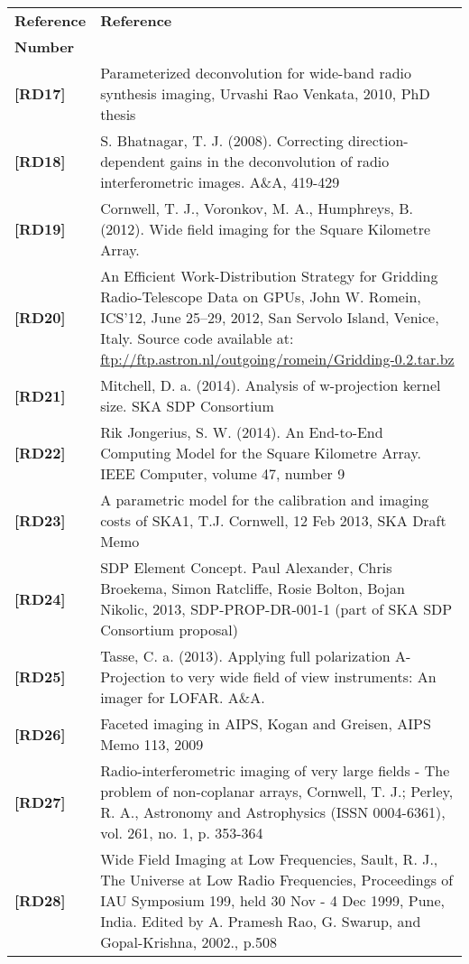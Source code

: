 \documentclass[11pt,a4paper]{article}
\begin{document}
 \begin{center}{
 \begin{tabularx}{\textwidth}{|l|X|}
     \hline
     \bf{Reference} & \bf{Reference}\\
     \bf{Number} & \\
     \hline
    {\bf [RD17]} & Parameterized deconvolution for wide-band radio synthesis
    imaging, Urvashi Rao Venkata, 2010, PhD thesis\\
    {\bf [RD18]} & S. Bhatnagar, T. J. (2008). Correcting direction-dependent gains in the deconvolution of radio interferometric images. A\&A, 419-429\\
    {\bf [RD19]} & Cornwell, T. J., Voronkov, M. A., Humphreys, B. (2012). Wide field imaging for the Square Kilometre Array.\\
    {\bf [RD20]} & An Efficient Work-Distribution Strategy for Gridding Radio-Telescope Data on GPUs, John W. Romein, ICS’12, June 25–29, 2012, San Servolo Island, Venice, Italy. Source code available at: \url{ftp://ftp.astron.nl/outgoing/romein/Gridding-0.2.tar.bz}\\
   {\bf [RD21]} & Mitchell, D. a. (2014). Analysis of w-projection kernel size. SKA SDP Consortium\\
   {\bf [RD22]} & Rik Jongerius, S. W. (2014). An End-to-End Computing Model for the Square Kilometre Array. IEEE Computer, volume 47, number 9\\
   {\bf [RD23]} & A parametric model for the calibration and imaging costs of SKA1, T.J. Cornwell, 12 Feb 2013, SKA Draft Memo\\
     {\bf [RD24]} & SDP Element Concept. Paul Alexander, Chris Broekema, Simon Ratcliffe, Rosie Bolton, Bojan Nikolic, 2013, SDP-PROP-DR-001-1 (part of SKA SDP Consortium proposal)\\
   {\bf [RD25]} & Tasse, C. a. (2013). Applying full polarization A-Projection to very wide field of view instruments: An imager for LOFAR. A\&A.\\
   {\bf [RD26]} & Faceted imaging in AIPS, Kogan and Greisen, AIPS Memo 113, 2009\\
   {\bf [RD27]} & Radio-interferometric imaging of very large fields - The
   problem of non-coplanar arrays, Cornwell, T. J.; Perley, R. A., Astronomy
   and Astrophysics (ISSN 0004-6361), vol. 261, no. 1, p. 353-364\\
    {\bf [RD28]} & Wide Field Imaging at Low Frequencies, Sault, R. J.,  The Universe at Low Radio Frequencies, Proceedings of IAU Symposium 199, held 30 Nov - 4 Dec 1999, Pune, India. Edited by A. Pramesh Rao, G. Swarup, and Gopal-Krishna, 2002., p.508\\

\end{tabularx}}
\end{center}
\end{document}
